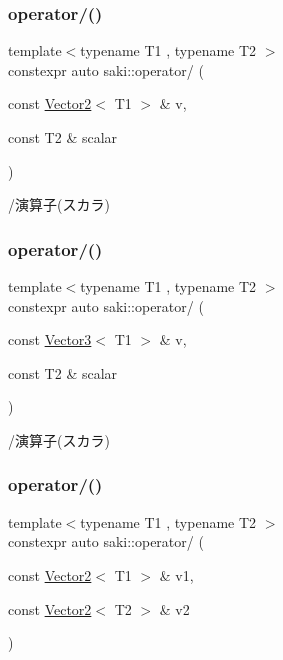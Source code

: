 \subsubsection{\texorpdfstring{operator/()}{operator/()}\hspace{0.1cm}{\footnotesize\ttfamily [1/4]}}
{\footnotesize\ttfamily template$<$typename T1 , typename T2 $>$ \\
constexpr auto saki\+::operator/ (\begin{DoxyParamCaption}\item[{const \mbox{\hyperlink{classsaki_1_1_vector2}{Vector2}}$<$ T1 $>$ \&}]{v,  }\item[{const T2 \&}]{scalar }\end{DoxyParamCaption})}



/演算子(スカラ) 

\mbox{\label{namespacesaki_abbbafb6bb5e04aa715db728862e079a8}} 
\subsubsection{\texorpdfstring{operator/()}{operator/()}\hspace{0.1cm}{\footnotesize\ttfamily [2/4]}}
{\footnotesize\ttfamily template$<$typename T1 , typename T2 $>$ \\
constexpr auto saki\+::operator/ (\begin{DoxyParamCaption}\item[{const \mbox{\hyperlink{classsaki_1_1_vector3}{Vector3}}$<$ T1 $>$ \&}]{v,  }\item[{const T2 \&}]{scalar }\end{DoxyParamCaption})}



/演算子(スカラ) 

\mbox{\label{namespacesaki_a6af4b5a4a56add022ed5bfde525d5979}} 
\subsubsection{\texorpdfstring{operator/()}{operator/()}\hspace{0.1cm}{\footnotesize\ttfamily [3/4]}}
{\footnotesize\ttfamily template$<$typename T1 , typename T2 $>$ \\
constexpr auto saki\+::operator/ (\begin{DoxyParamCaption}\item[{const \mbox{\hyperlink{classsaki_1_1_vector2}{Vector2}}$<$ T1 $>$ \&}]{v1,  }\item[{const \mbox{\hyperlink{classsaki_1_1_vector2}{Vector2}}$<$ T2 $>$ \&}]{v2 }\end{DoxyParamCaption})}



